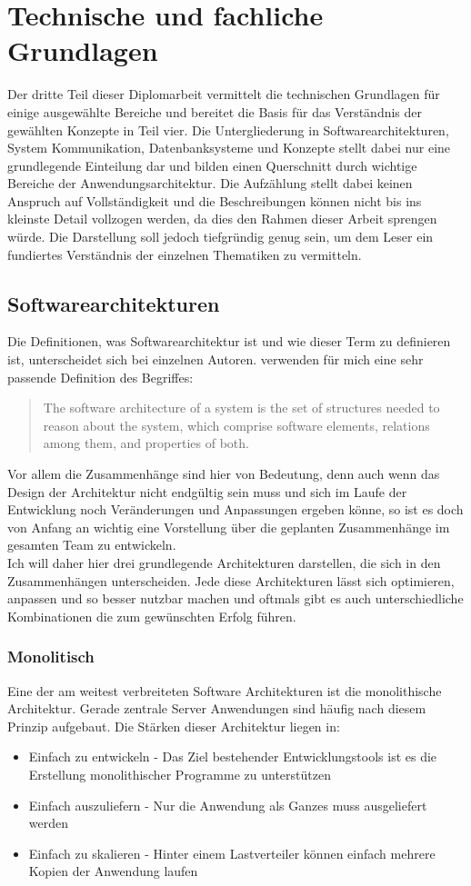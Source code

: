 \chapter{Technische und fachliche Grundlagen} 
\label{ch:grundlagen}
Der dritte Teil dieser Diplomarbeit vermittelt die technischen Grundlagen für einige ausgewählte Bereiche und bereitet die Basis für das Verständnis der gewählten Konzepte in Teil vier. Die Untergliederung in Softwarearchitekturen, System Kommunikation, Datenbanksysteme und Konzepte stellt dabei nur eine grundlegende Einteilung dar und bilden einen Querschnitt durch wichtige Bereiche der Anwendungsarchitektur. Die Aufzählung stellt dabei keinen Anspruch auf Vollständigkeit und die Beschreibungen können nicht bis ins kleinste Detail vollzogen werden, da dies den Rahmen dieser Arbeit sprengen würde. Die Darstellung soll jedoch tiefgründig genug sein, um dem Leser ein fundiertes Verständnis der einzelnen Thematiken zu vermitteln.

\section{Softwarearchitekturen}
Die Definitionen, was Softwarearchitektur ist und wie dieser Term zu definieren ist, unterscheidet sich bei einzelnen Autoren. \citet*[S. 4]{Bass.2013} verwenden für mich eine sehr passende Definition des Begriffes:
	\begin{quote} 
	The software architecture of a system is the set of structures needed to reason about the system, which comprise software elements, relations among them, and properties of both.
	 \end{quote}
Vor allem die Zusammenhänge sind hier von Bedeutung, denn auch wenn das Design der Architektur nicht endgültig sein muss und sich im Laufe der Entwicklung noch Veränderungen und Anpassungen ergeben könne, so ist es doch von Anfang an wichtig eine Vorstellung über die geplanten Zusammenhänge im gesamten Team zu entwickeln.\\
Ich will daher hier drei grundlegende Architekturen darstellen, die sich in den Zusammenhängen unterscheiden. Jede diese Architekturen lässt sich optimieren, anpassen und so besser nutzbar machen und oftmals gibt es auch unterschiedliche Kombinationen die zum gewünschten Erfolg führen.
	\subsection{Monolitisch}
	Eine der am weitest verbreiteten Software Architekturen ist die monolithische Architektur. Gerade zentrale Server Anwendungen sind häufig nach diesem Prinzip aufgebaut. Die Stärken dieser Architektur liegen in:
	\begin{itemize}
	\item Einfach zu entwickeln - Das Ziel bestehender Entwicklungstools ist es die Erstellung monolithischer Programme zu unterstützen 
	\item Einfach auszuliefern - Nur die Anwendung als Ganzes muss ausgeliefert werden
	\item Einfach zu skalieren - Hinter einem Lastverteiler können einfach mehrere Kopien der Anwendung laufen
	\end{itemize}
	
